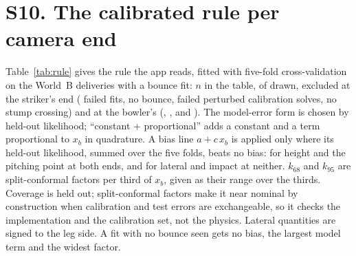\documentclass[journal]{IEEEtran}
\begin{document}
\section*{S10. The calibrated rule per camera end}

Table~\ref{tab:rule} gives the rule the app reads, fitted with five-fold cross-validation on the World~B
deliveries with a bounce fit: $n$ in the table, of \CovBN{} drawn, \CalStrikerExcluded{} excluded at the
striker's end (\DenStrikerNotFitted{} failed fits, \DenStrikerNoBounce{} no bounce, \CalStrikerYUnbounded{} failed perturbed
calibration solves, \DenStrikerNoCross{} no stump crossing) and \CalBowlerExcluded{} at the bowler's (\DenBowlerNotFitted,
\DenBowlerNoBounce, \CalBowlerYUnbounded{} and \DenBowlerNoCross). The model-error form is chosen by held-out likelihood; ``constant + proportional'' adds a
constant and a term proportional to $x_b$ in quadrature. A bias line $a + c\,x_b$ is applied only where its
held-out likelihood, summed over the five folds, beats no bias: for height and the pitching point at both ends, and for lateral and impact at neither. $k_{68}$ and $k_{95}$ are
split-conformal factors per third of $x_b$, given as their range over the thirds. Coverage is held out;
split-conformal factors make it near nominal by construction when calibration and test errors are
exchangeable, so it checks the implementation and the calibration set, not the physics.
Lateral quantities are signed to the leg side. A fit with no bounce seen gets no bias, the largest model term and the widest factor.
\end{document}
